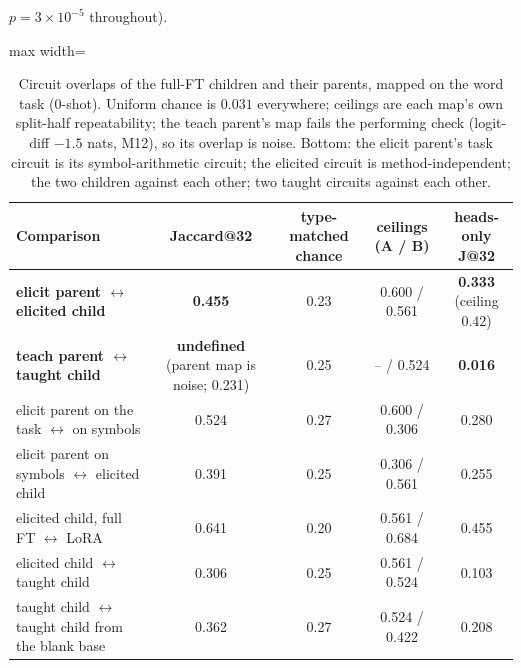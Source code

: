 \documentclass[11pt]{article}
\newenvironment{steps}{\begin{itemize}[nosep,leftmargin=1.2em,topsep=2pt]}{\end{itemize}}
\begin{document}
\begin{enumerate}[label=\textbf{M\arabic*}, leftmargin=*, itemsep=1.2em, resume]
{\begin{steps}
$p=3\times10^{-5}$ throughout).
\end{steps}}
\begin{table}[h]\centering\small
\begin{adjustbox}{max width=\textwidth}
\begin{tabular}{lcccc}
\toprule
Comparison & Jaccard@32 & type-matched chance & ceilings (A / B) & heads-only J@32 \\
\midrule
\textbf{elicit parent $\leftrightarrow$ elicited child} & \textbf{0.455} & 0.23 & 0.600 / 0.561 & \textbf{0.333} (ceiling 0.42) \\
\textbf{teach parent $\leftrightarrow$ taught child} & \textbf{undefined} (parent map is noise; 0.231) & 0.25 & -- / 0.524 & \textbf{0.016} \\
\midrule
elicit parent on the task $\leftrightarrow$ on symbols & 0.524 & 0.27 & 0.600 / 0.306 & 0.280 \\
elicit parent on symbols $\leftrightarrow$ elicited child & 0.391 & 0.25 & 0.306 / 0.561 & 0.255 \\
elicited child, full FT $\leftrightarrow$ LoRA & 0.641 & 0.20 & 0.561 / 0.684 & 0.455 \\
elicited child $\leftrightarrow$ taught child & 0.306 & 0.25 & 0.561 / 0.524 & 0.103 \\
taught child $\leftrightarrow$ taught child from the blank base & 0.362 & 0.27 & 0.524 / 0.422 & 0.208 \\
\bottomrule
\end{tabular}
\end{adjustbox}
\caption{Circuit overlaps of the full-FT children and their parents, mapped on the word task
(0-shot). Uniform chance is $0.031$ everywhere; ceilings are each map's own split-half
repeatability; the teach parent's map fails the performing check (logit-diff $-1.5$ nats, M12),
so its overlap is noise.
Bottom: the elicit parent's task circuit is its symbol-arithmetic circuit; the elicited circuit
is method-independent; the two children against each other; two taught circuits against each
other.}
\label{tab:overlap}
\end{table}


\end{enumerate}
\end{document}
